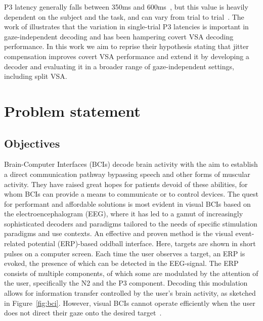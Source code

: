 P3 latency generally falls between 350ms and 600ms~\cite{Luck2014}, but this
value is heavily dependent on the subject and the task, and can vary from trial
to trial~\cite{Ouyang2017}.
The work of \cite{Arico2014}
illustrates that the variation in single-trial P3 latencies is important in
gaze-independent decoding and has been hampering covert VSA decoding performance.
In this work we aim to reprise their hypothesis stating that jitter compensation improves
covert VSA performance and extend it by developing a decoder and evaluating it
in a broader range of gaze-independent settings, including split VSA.


\section{Problem statement}

\subsection{Objectives}

Brain-Computer Interfaces (BCIs) decode brain activity with the aim to establish a direct communication
pathway bypassing speech and other forms of muscular activity. They have raised great hopes for patients
devoid of these abilities, for whom BCIs can provide a means to communicate or to
control devices.
The quest for performant and affordable solutions is most evident in
visual BCIs based on the electroencephalogram (EEG), where it has led to a gamut of increasingly sophisticated decoders
and paradigms tailored to the needs of specific stimulation paradigms and
use contexts.
An effective and proven method is the visual event-related potential (ERP)-based
oddball interface.
Here, targets are shown in short pulses on a computer screen.
Each time the user observes a target, an ERP is evoked, the presence of which can be
detected in the EEG-signal.
The ERP consists of multiple components, of which some are modulated by the
attention of the user, specifically the N2 and the P3 component.
Decoding this modulation allows for information transfer controlled by the
user's brain activity, as sketched in Figure~\ref{fig:bci}.
However, visual BCIs cannot operate efficiently when the user does not direct
their gaze onto the desired target~\cite{Brunner2010, Frenzel2011}.

